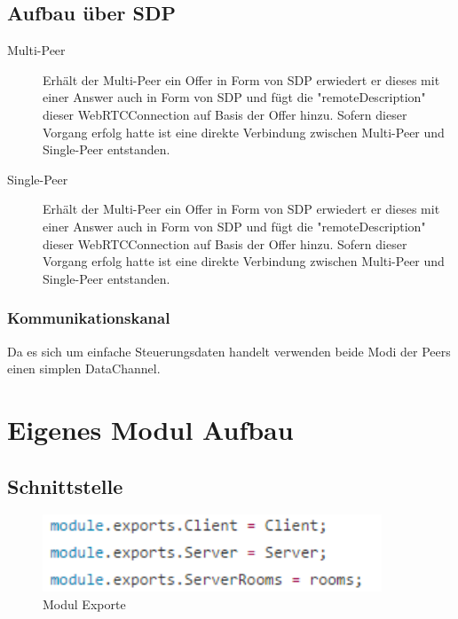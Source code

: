 \subsection{Aufbau über SDP}
\begin{description}
\item[Multi-Peer]
Erhält der Multi-Peer ein Offer in Form von SDP erwiedert er dieses mit einer Answer auch in Form von SDP und fügt die "remoteDescription" dieser WebRTCConnection auf Basis der Offer hinzu. Sofern dieser Vorgang erfolg hatte ist eine direkte Verbindung zwischen Multi-Peer und Single-Peer entstanden.

\item[Single-Peer]
Erhält der Multi-Peer ein Offer in Form von SDP erwiedert er dieses mit einer Answer auch in Form von SDP und fügt die "remoteDescription" dieser WebRTCConnection auf Basis der Offer hinzu. Sofern dieser Vorgang erfolg hatte ist eine direkte Verbindung zwischen Multi-Peer und Single-Peer entstanden.
\end{description}

\subsubsection{Kommunikationskanal}
Da es sich um einfache Steuerungsdaten handelt verwenden beide Modi der Peers einen simplen DataChannel.

\section{Eigenes Modul Aufbau}
\subsection{Schnittstelle}
\begin{figure}[ht]
\centering
\includegraphics[width=0.9\textwidth]{backend/ModulExports.PNG}
\caption{Modul Exporte}
\label{backfig2}
\end{figure}

